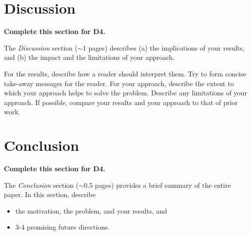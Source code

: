 \documentclass[letterpaper]{article} %
\begin{document}

\section{Discussion}

{\bf Complete this section for D4.}

The {\it Discussion} section ($\sim$1 pages) describes (a) the implications of your results, and (b) the impact and the limitations of your approach.  

For the results, describe how a reader should interpret them.  Try to form concise take-away messages for the reader.  For your approach, describe the extent to which your approach helps to solve the problem.  Describe any limitations of your approach.  If possible, compare your results and your approach to that of prior work. 


\section{Conclusion}

{\bf Complete this section for D4.}

The {\it Conclusion} section ($\sim$0.5 pages) provides a brief summary of the entire paper.  In this section, describe 
\begin{itemize}
    \item the motivation, the problem, and your results, and
    \item 3-4 promising future directions.
\end{itemize}

\newpage


\end{document}
